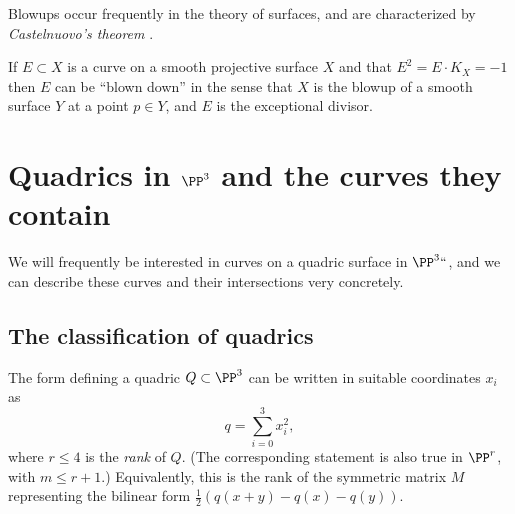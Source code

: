 Blowups occur frequently in the theory of surfaces, and are
%
characterized by \emph{Castelnuovo's theorem} 
\cite[Theorem V.5.7]{Hartshorne1977}. 

\begin{theorem}
If $E\subset X$ is a curve on a smooth projective surface $X$ and
%
 that $E^2 = E\cdot K_X = -1$ then $E$ can be ``blown down'' in the sense that
 $X$ is the blowup of a smooth surface $Y$ at a point $p\in Y$, and $E$ is the exceptional divisor.
\end{theorem}




\section{Quadrics in $\PP^3$ and the curves they contain}
\label{Div of quadric}
 
 We will frequently be interested in curves on a quadric surface in $\PP^3` `$, and we can describe these
curves and their intersections very concretely.

\subsection*{The classification of quadrics} The form defining a quadric $Q\subset \PP^{3}$ can be written in suitable
%
coordinates $x_{i}$ as 
$$q = \sum_{i=0}^{3} x_{i}^{2},$$ 
where $r\leq 4$ is the \emph{rank} of $Q$. (The corresponding
statement is also true in $\PP^{r}$, with $m\leq r+1$.) Equivalently, this is the rank of the symmetric matrix $M$
representing the bilinear form $\frac12(q(x+y)-q(x)-q(y))$.

